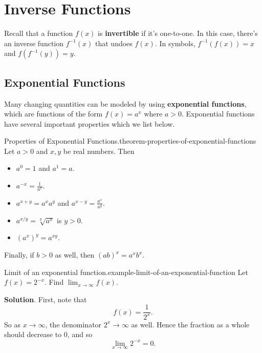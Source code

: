 \documentclass[10pt,]{book}
\newcommand{\terminology}[1]{\textbf{#1}}
\numberwithin{equation}{section}
\begin{document}
\chapter[{Inverse Functions}]{Inverse Functions}\label{inverse-functions}
\begin{introduction}{}%
\hypertarget{p-185}{}%
Recall that a function \(f(x)\) is \terminology{invertible} if it's one-to-one. In this case, there's an inverse function \(f^{-1}(x)\) that undoes \(f(x)\). In symbols, \(f^{-1}(f(x)) = x\) and \(f(f^{-1}(y)) = y\).%
\end{introduction}%
%
%
\typeout{************************************************}
\typeout{************************************************}
%
\section[{Exponential Functions}]{Exponential Functions}\label{section-exponential-functions}
\hypertarget{p-186}{}%
Many changing quantities can be modeled by using \terminology{exponential functions}, which are functions of the form \(f(x) = a^{x}\) where \(a > 0\). Exponential functions have several important properties which we list below.%
\begin{theorem}{Properties of Exponential Functions.}{}{theorem-properties-of-exponential-functions}%
\hypertarget{p-187}{}%
Let \(a > 0\) and \(x,y\) be real numbers. Then \leavevmode%
\begin{itemize}[label=\textbullet]
\item{}\(a^{0} = 1\) and \(a^{1} = a\).%
\item{}\(a^{-x} = \frac{1}{a^{x}}\).%
\item{}\(a^{x+y} = a^{x}a^{y}\) and \(a^{x-y} = \frac{a^{x}}{a^{y}}\).%
\item{}\(a^{x/y} = \sqrt[y]{a^{x}}\) is \(y > 0\).%
\item{}\((a^{x})^{y} = a^{xy}\).%
\end{itemize}
 Finally, if \(b > 0\) as well, then \((ab)^{x} = a^{x}b^{x}\).%
\end{theorem}
\begin{example}{Limit of an exponential function.}{example-limit-of-an-exponential-function}%
\hypertarget{p-188}{}%
Let \(f(x) = 2^{-x}\). Find \(\lim_{x\to\infty}f(x)\).%
\par\smallskip%
\noindent\textbf{Solution}.\hypertarget{solution-42}{}\quad%
\hypertarget{p-189}{}%
First, note that%
\begin{equation*}
f(x) = \frac{1}{2^{x}}.
\end{equation*}
So as \(x\to\infty\), the denominator \(2^{x}\to\infty\) as well. Hence the fraction as a whole should decrease to \(0\), and so%
\begin{equation*}
\lim_{x\to\infty}2^{-x} = 0.
\end{equation*}
%
\end{example}
\end{document}
